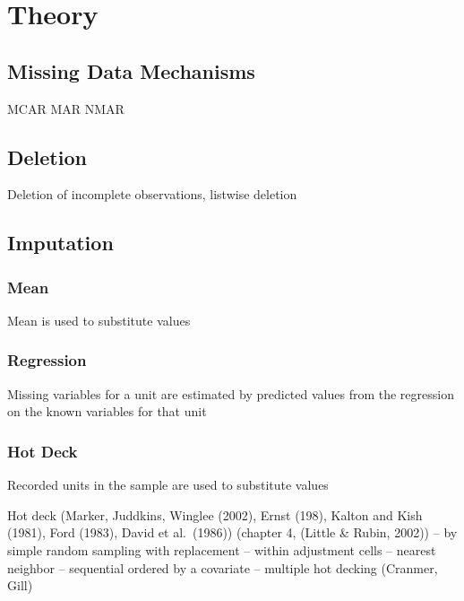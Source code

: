 \documentclass[12pt,econ]{sources/authesis}
\begin{document}
\hypertarget{ordmiss-theory}{%
\section{Theory}\label{ordmiss-theory}}

\hypertarget{ordmiss-theory-mechanisms}{%
\subsection{Missing Data Mechanisms}\label{ordmiss-theory-mechanisms}}

MCAR
MAR
NMAR

\hypertarget{ordmiss-theory-delete}{%
\subsection{Deletion}\label{ordmiss-theory-delete}}

Deletion of incomplete observations, listwise deletion

\hypertarget{ordmiss-theory-impute}{%
\subsection{Imputation}\label{ordmiss-theory-impute}}

\hypertarget{ordmiss-theory-impute-mean}{%
\subsubsection{Mean}\label{ordmiss-theory-impute-mean}}

Mean is used to substitute values

\hypertarget{ordmiss-theory-impute-regress}{%
\subsubsection{Regression}\label{ordmiss-theory-impute-regress}}

Missing variables for a unit are estimated by predicted values from the regression on the known variables for that unit

\hypertarget{ordmiss-theory-impute-hot}{%
\subsubsection{Hot Deck}\label{ordmiss-theory-impute-hot}}

Recorded units in the sample are used to substitute values

Hot deck (Marker, Juddkins, Winglee (2002), Ernst (198), Kalton and Kish (1981), Ford (1983), David et al.~(1986)) (chapter 4, (Little \& Rubin, 2002))
-- by simple random sampling with replacement
-- within adjustment cells
-- nearest neighbor
-- sequential ordered by a covariate
-- multiple hot decking (Cranmer, Gill)
\end{document}
